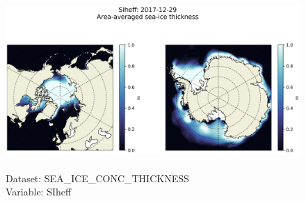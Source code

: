 \begin{figure}[H]
\centering
\includegraphics[scale=0.5]{../images/plots/latlon_plots/Sea-Ice_and_Snow_Concentration_and_Thickness/SIheff.png}
\caption{\\Dataset: SEA\_ICE\_CONC\_THICKNESS\\Variable: SIheff}
\label{tab:table-SEA_ICE_CONC_THICKNESS_SIheff-Plot}
\end{figure}
\pagebreak
